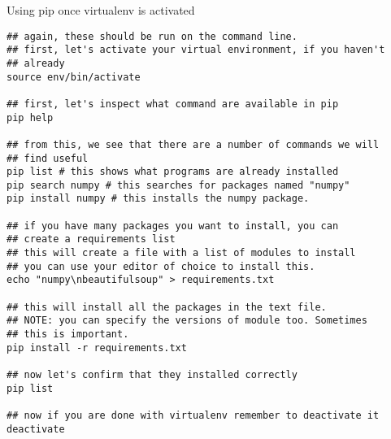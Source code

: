 \documentclass[presentation]{beamer}
\begin{document}
\begin{frame}[fragile,label=sec-7-6]{Using pip once virtualenv is activated}

 \lstset{numbers=left,language=sh}
\begin{lstlisting}
## again, these should be run on the command line. 
## first, let's activate your virtual environment, if you haven't 
## already
source env/bin/activate

## first, let's inspect what command are available in pip
pip help

## from this, we see that there are a number of commands we will 
## find useful
pip list # this shows what programs are already installed
pip search numpy # this searches for packages named "numpy"
pip install numpy # this installs the numpy package. 

## if you have many packages you want to install, you can 
## create a requirements list
## this will create a file with a list of modules to install
## you can use your editor of choice to install this. 
echo "numpy\nbeautifulsoup" > requirements.txt

## this will install all the packages in the text file. 
## NOTE: you can specify the versions of module too. Sometimes
## this is important. 
pip install -r requirements.txt

## now let's confirm that they installed correctly
pip list 

## now if you are done with virtualenv remember to deactivate it
deactivate
\end{lstlisting}
\end{frame}
\end{document}
